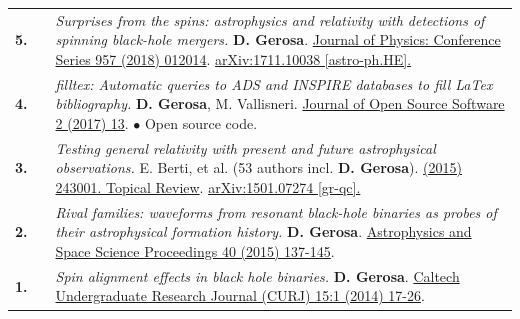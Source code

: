 {\begin{longtable}{rp{0.3cm}p{15.8cm}}
%
\textbf{5.} & & \textit{Surprises from the spins: astrophysics and relativity with detections of spinning black-hole mergers.}
\newline{}
\textbf{D. Gerosa}.
\newline{}
\href{http://dx.doi.org/10.1088/1742-6596/957/1/012014}{Journal of Physics: Conference Series 957 (2018) 012014}. \href{https://arxiv.org/abs/1711.10038}{arXiv:1711.10038 [astro-ph.HE].}
\vspace{0.09cm}\\
%
\textbf{4.} & & \textit{filltex: Automatic queries to ADS and INSPIRE databases to fill LaTex bibliography.}
\newline{}
\textbf{D. Gerosa}, M. Vallisneri.
\newline{}
\href{http://dx.doi.org/10.21105/joss.00222}{Journal of Open Source Software 2 (2017) 13}. 
\newline{}
\textcolor{color1}{$\bullet$} Open source code.
\vspace{0.09cm}\\
%
\textbf{3.} & & \textit{Testing general relativity with present and future astrophysical observations.}
\newline{}
E. Berti, et al. (53 authors incl. \textbf{D. Gerosa}).
\newline{}
\href{http://dx.doi.org/10.1088/0264-9381/32/24/243001}{\cqg 32 (2015) 243001. Topical Review}. \href{https://arxiv.org/abs/1501.07274}{arXiv:1501.07274 [gr-qc].}
\vspace{0.09cm}\\
%
\textbf{2.} & & \textit{Rival families: waveforms from resonant black-hole binaries as probes of their astrophysical formation history.}
\newline{}
\textbf{D. Gerosa}.
\newline{}
\href{http://dx.doi.org/10.1007/978-3-319-10488-1_12}{Astrophysics and Space Science Proceedings 40 (2015) 137-145}. 
\vspace{0.09cm}\\
%
\textbf{1.} & & \textit{Spin alignment effects in black hole binaries.}
\newline{}
\textbf{D. Gerosa}.
\newline{}
\href{https://caltechcampuspubs.library.caltech.edu/2800/}{Caltech Undergraduate Research Journal (CURJ) 15:1 (2014) 17-26}. 
\vspace{0.09cm}\\
%
\end{longtable} }